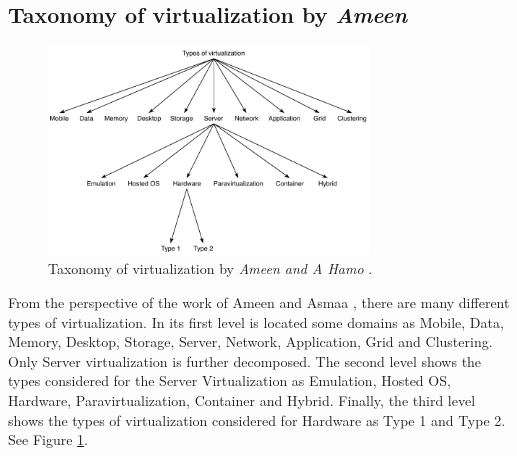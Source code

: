 	\subsection{Taxonomy of virtualization by \textit{Ameen}}
	
	\begin{figure}[H]
		\centering
		\includegraphics[width=8.5cm]{images/AmeenAndHamo2003.pdf}
		\caption{Taxonomy of virtualization by \textit{Ameen and A Hamo} \cite{Ameen2013}.} 
		\label{fig:TaxonomyOfVirtualizationByAmeen}
	\end{figure}



    From the perspective of the work of Ameen and Asmaa \cite{Ameen2013}, there are many different types of virtualization. In its first level is located some domains as  Mobile, Data, Memory, Desktop, Storage, Server, Network, Application, Grid and Clustering. Only Server virtualization is further decomposed. The second level shows the types considered for the Server Virtualization as Emulation, Hosted OS, Hardware, Paravirtualization, Container and Hybrid. Finally, the third level shows the types of virtualization considered for Hardware as Type 1 and Type 2. See Figure \ref{fig:TaxonomyOfVirtualizationByAmeen}.
    
